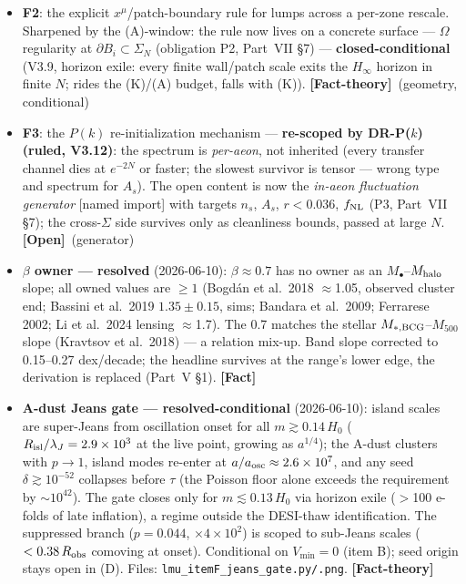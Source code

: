 \documentclass[11pt]{article}
\newcommand{\fact}{\textcolor{green!40!black}{\textbf{[Fact]}}}
\newcommand{\factth}{\textcolor{green!40!black}{\textbf{[Fact-theory]}}}
\newcommand{\open}{\textcolor{red!70!black}{\textbf{[Open]}}}
\begin{document}
\begin{itemize}[leftmargin=2.6em,itemsep=3pt]
\item[\textbf{(C)}] \textbf{F2}: the explicit $x^\mu$/patch-boundary rule for lumps across a per-zone rescale. Sharpened by the (A)-window: the rule now lives on a concrete surface --- $\Omega$ regularity at $\partial B_i\subset\Sigma_N$ (obligation P2, Part~VII \S7) --- \textbf{closed-conditional} (V3.9, horizon exile: every finite wall/patch scale exits the $H_\infty$ horizon in finite $N$; rides the (K)/(A) budget, falls with (K)). \factth\ (geometry, conditional)
\item[\textbf{(D)}] \textbf{F3}: the $P(k)$ re-initialization mechanism --- \textbf{re-scoped by DR-P($k$) (ruled, V3.12)}: the spectrum is \emph{per-aeon}, not inherited (every transfer channel dies at $e^{-2N}$ or faster; the slowest survivor is tensor --- wrong type and spectrum for $A_s$). The open content is now the \emph{in-aeon fluctuation generator} [named import] with targets $n_s$, $A_s$, $r<0.036$, $f_{\rm NL}$ (P3, Part~VII \S7); the cross-$\Sigma$ side survives only as cleanliness bounds, passed at large $N$. \open\ (generator)
\item[\textbf{(E)}] \textbf{$\beta$ owner --- resolved} (2026-06-10): $\beta\approx0.7$ has no owner as an $M_\bullet$--$M_{\rm halo}$ slope; all owned values are $\ge1$ (Bogd\'an et al.\ 2018 $\approx$1.05, observed cluster end; Bassini et al.\ 2019 $1.35\pm0.15$, sims; Bandara et al.\ 2009; Ferrarese 2002; Li et al.\ 2024 lensing $\approx$1.7). The 0.7 matches the stellar $M_{*,\rm BCG}$--$M_{500}$ slope (Kravtsov et al.\ 2018) --- a relation mix-up. Band slope corrected to 0.15--0.27 dex/decade; the headline survives at the range's lower edge, the derivation is replaced (Part~V \S1). \fact
\item[\textbf{(F)}] \textbf{A-dust Jeans gate --- resolved-conditional} (2026-06-10): island scales are super-Jeans from oscillation onset for all $m\gtrsim0.14\,H_0$ ($R_{\rm isl}/\lambda_J=2.9\times10^3$ at the live point, growing as $a^{1/4}$); the A-dust clusters with $p\to1$, island modes re-enter at $a/a_{\rm osc}\approx2.6\times10^7$, and any seed $\delta\gtrsim10^{-52}$ collapses before $\tau$ (the Poisson floor alone exceeds the requirement by $\sim\!10^{42}$). The gate closes only for $m\lesssim0.13\,H_0$ via horizon exile ($>$100 e-folds of late inflation), a regime outside the DESI-thaw identification. The suppressed branch ($p=0.044$, $\times4\times10^2$) is scoped to sub-Jeans scales ($<0.38\,R_{\rm obs}$ comoving at onset). Conditional on $V_{\min}=0$ (item B); seed origin stays open in (D). Files: \texttt{lmu\_itemF\_jeans\_gate.py/.png}. \factth

\end{itemize}
\end{document}
